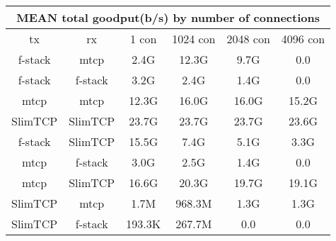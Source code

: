 
\begin{center}
\begin{tabular}{ c c c c c c }
\multicolumn{6}{c}{MEAN total goodput(b/s) by number of connections} \\
\hline
tx & rx & 1 con & 1024 con & 2048 con & 4096 con \\
f-stack & mtcp & 2.4G & 12.3G & 9.7G & 0.0 \\
f-stack & f-stack & 3.2G & 2.4G & 1.4G & 0.0 \\
mtcp & mtcp & 12.3G & 16.0G & 16.0G & 15.2G \\
SlimTCP & SlimTCP & 23.7G & 23.7G & 23.7G & 23.6G \\
f-stack & SlimTCP & 15.5G & 7.4G & 5.1G & 3.3G \\
mtcp & f-stack & 3.0G & 2.5G & 1.4G & 0.0 \\
mtcp & SlimTCP & 16.6G & 20.3G & 19.7G & 19.1G \\
SlimTCP & mtcp & 1.7M & 968.3M & 1.3G & 1.3G \\
SlimTCP & f-stack & 193.3K & 267.7M & 0.0 & 0.0 \\

\end{tabular}
\end{center}
